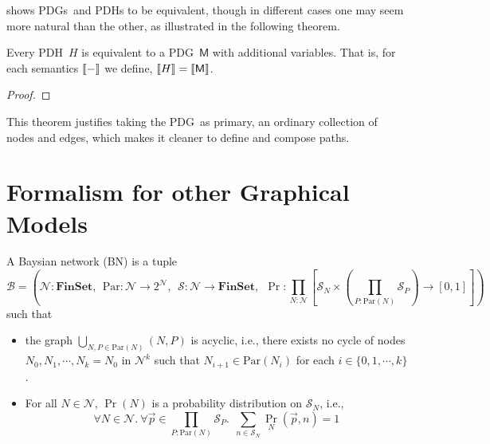 \documentclass{article}
\newcommand{\sfM}{\mathsf M}
\newcommand{\MN}{PDG}
\newcommand{\MNH}{PDH}
\newcommand{\MNs}{\MN s}
\numberwithin{equation}{section}
\begin{document}
\begin{notfocus}
	 shows \MNs\ and \MNH s to be equivalent, though in different cases one may seem more natural than the other, as illustrated in the following theorem.
	
	\begin{theorem}[restate=thmhyperequiv]\label{thm:hyperequiv}
		Every \MNH\ $H$ is equivalent to a \MN\ $\sfM$ with additional variables. That is, for each semantics $\llbracket-\rrbracket$ we define, $\bbr{H} = \bbr{\sfM}$.
	\end{theorem}
	\begin{proof}
		\todo{}
	\end{proof}
	
	This theorem justifies taking the \MN\ as primary, an ordinary collection of nodes and edges, which makes it cleaner to define and compose paths. 

	
	\section{Formalism for other Graphical Models}
	\begin{defn}
		A Baysian network (BN) is a tuple
		\[
		\mathcal B = \left(\mathcal N : \mathbf{FinSet}, ~~\mathrm{Par}: \mathcal N \to 2^{\mathcal N},~~ \mathcal S: \mathcal N \to \mathbf{FinSet},~~\Pr: \prod_{N : \mathcal N}  \left[ \mathcal S_N \times \left(\prod_{P : \mathrm{Par}(N)} \mathcal S_P\right)  \to [0,1] \right] \right)
		\]
		such that
		\begin{itemize}[nosep]
			\item the graph $\bigcup_{N, P \in \mathrm{Par}(N)}(N, P)$ is acyclic, i.e., there exists no cycle of nodes $N_0, N_1, \cdots, N_k = N_0$ in $\mathcal N^k$ such that $N_{i+1} \in \mathrm{Par}(N_i)$ for each $i \in \{0, 1, \cdots, k\}$.
			\item For all $N \in \mathcal N$, $\Pr(N)$ is a probability distribution on $\mathcal S_N$, i.e., 
			\[ \forall N\in \mathcal N.~\forall \vec{p} \in {\prod_{P : \mathrm{Par}(N)} \mathcal S_P}.~~ \sum_{n \in \mathcal S_{N}} \Pr_N(\vec{p}, n) = 1\]
		\end{itemize}
	\end{defn}
	

\end{notfocus}
\end{document}
